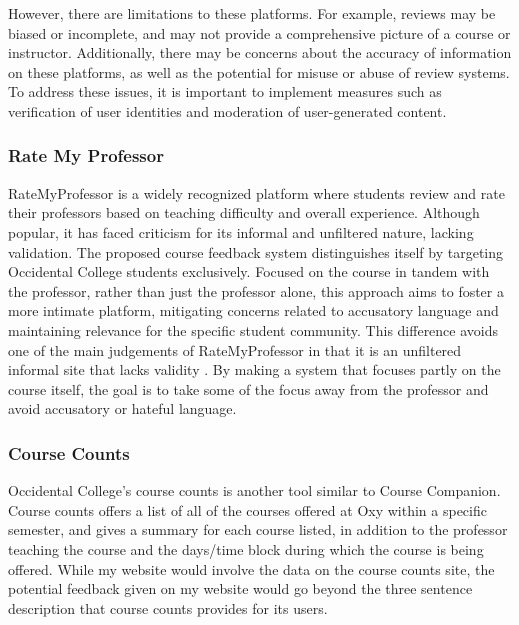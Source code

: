 \documentclass[10pt,twocolumn]{article}
\begin{document}
However, there are limitations to these platforms. For example, reviews may be biased or incomplete, and may not provide a comprehensive picture of a course or instructor. Additionally, there may be concerns about the accuracy of information on these platforms, as well as the potential for misuse or abuse of review systems. To address these issues, it is important to implement measures such as verification of user identities and moderation of user-generated content.


\subsubsection{Rate My Professor}
RateMyProfessor is a widely recognized platform where students review and rate their professors based on teaching difficulty and overall experience. Although popular, it has faced criticism for its informal and unfiltered nature, lacking validation. The proposed course feedback system distinguishes itself by targeting Occidental College students exclusively. Focused on the course in tandem with the professor, rather than just the professor alone, this approach aims to foster a more intimate platform, mitigating concerns related to accusatory language and maintaining relevance for the specific student community. This difference avoids one of the main judgements of RateMyProfessor in that it is an unfiltered informal site that lacks validity \cite{gregory12}. By making a system that focuses partly on the course itself, the goal is to take some of the focus away from the professor and avoid accusatory or hateful language.

\subsubsection{Course Counts}
Occidental College's course counts is another tool similar to Course Companion. Course counts offers a list of all of the courses offered at Oxy within a specific semester, and gives a summary for each course listed, in addition to the professor teaching the course and the days/time block during which the course is being offered. While my website would involve the data on the course counts site, the potential feedback given on my website would go beyond the three sentence description that course counts provides for its users.
\end{document}
